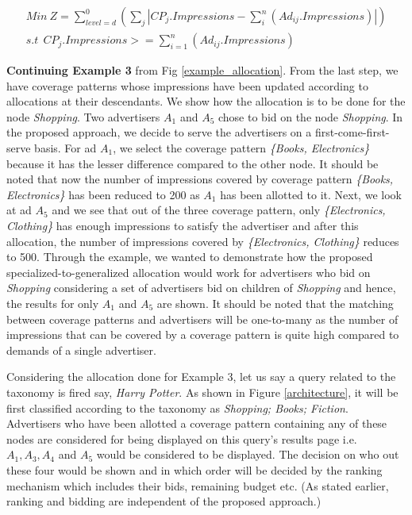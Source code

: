 \begin{subequations}
\label{optiProb}
\begin{gather}
Min \ Z =  \sum_{level = d}^{0} (\sum_{j} |CP_{j}.Impressions - 
\sum_{i}^{n} (Ad_{ij}.Impressions)|) \label{impressionGoal} \\
s.t\ \ CP_{j}.Impressions >= \sum_{i=1}^{n} (Ad_{ij}.Impressions)
\label{constraint1}
\end{gather}
\end{subequations}

\textbf{Continuing Example 3} from Fig \ref{example_allocation}. From the last step, we have coverage patterns whose impressions have been updated according to allocations at their descendants. We show how the allocation is to be done for the node \textit{Shopping}. Two advertisers $A_{1}$ and $A_{5}$ chose to bid on the node \textit{Shopping}. In the proposed approach, we decide to serve the advertisers on a first-come-first-serve basis. For ad $A_{1}$, we select the coverage pattern \textit{\{Books, Electronics\}} because it has the lesser difference compared to the other node. It should be noted that now the number of impressions covered by coverage pattern \textit{\{Books, Electronics\}} has been reduced to 200 as $A_{1}$ has been allotted to it. Next, we look at ad $A_{5}$ and we see that out of the three coverage pattern, only \textit{\{Electronics, Clothing\}} has enough impressions to satisfy the advertiser and after this allocation, the number of impressions covered by \textit{\{Electronics, Clothing\}} reduces to 500. Through the example, we wanted to demonstrate how the proposed specialized-to-generalized allocation would work for advertisers who bid on \textit{Shopping} considering a set of advertisers bid on children of \textit{Shopping} and hence, the results for only $A_{1}$ and $A_{5}$ are shown. It should be noted that the matching between coverage patterns and advertisers will be one-to-many as the number of impressions that can be covered by a coverage pattern is quite high compared to demands of a single advertiser.

Considering the allocation done for Example 3, let us say a query related to the taxonomy is fired say, \textit{Harry Potter}. As shown in Figure \ref{architecture}, it will be first classified according to the taxonomy as \textit{Shopping; Books; Fiction}. Advertisers who have been allotted a coverage pattern containing any of these nodes are considered for being displayed on this query's results page i.e. $A_{1}, A_{3}, A_{4}$ and $A_{5}$ would be considered to be displayed. The decision on who out these four would be shown and in which order will be decided by the ranking mechanism which includes their bids, remaining budget etc. (As stated earlier, ranking and bidding are independent of the proposed approach.)


